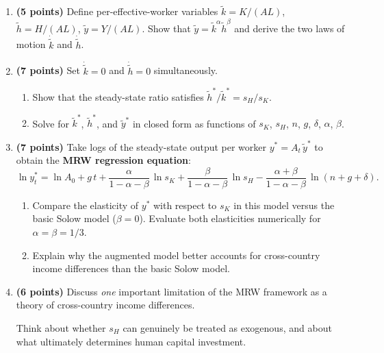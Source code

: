 \documentclass[a4paper,11pt]{article}
\newcommand{\ktilde}{\tilde{k}}
\newcommand{\ytilde}{\tilde{y}}
\newcommand{\htilde}{\tilde{h}}
\begin{document}
\begin{enumerate}[label=\textbf{\arabic*.}, leftmargin=*, itemsep=6pt]

    \item \textbf{(5 points)}
    Define per-effective-worker variables $\ktilde = K/(AL)$,
    $\htilde = H/(AL)$, $\ytilde = Y/(AL)$.  Show that $\ytilde = \ktilde^{\alpha}\htilde^{\beta}$
    and derive the two laws of motion $\dot{\ktilde}$ and $\dot{\htilde}$.

    \item \textbf{(7 points)}
    Set $\dot{\ktilde} = 0$ and $\dot{\htilde} = 0$ simultaneously.
    \begin{enumerate}[label=(\alph*), itemsep=4pt]
        \item Show that the steady-state ratio satisfies $\htilde^*/\ktilde^* = s_H/s_K$.
        \item Solve for $\ktilde^*$, $\htilde^*$, and $\ytilde^*$ in closed form as
        functions of $s_K$, $s_H$, $n$, $g$, $\delta$, $\alpha$, $\beta$.
    \end{enumerate}

    \item \textbf{(7 points)}
    Take logs of the steady-state output per worker $y^* = A_t\,\ytilde^*$ to obtain the
    \textbf{MRW regression equation}:
    \[
        \ln y_t^* = \ln A_0 + g\,t
        + \frac{\alpha}{1-\alpha-\beta}\,\ln s_K
        + \frac{\beta}{1-\alpha-\beta}\,\ln s_H
        - \frac{\alpha+\beta}{1-\alpha-\beta}\,\ln(n+g+\delta).
    \]
    \begin{enumerate}[label=(\alph*), itemsep=4pt]
        \item Compare the elasticity of $y^*$ with respect to $s_K$ in this model versus
        the basic Solow model ($\beta=0$).  Evaluate both elasticities numerically for
        $\alpha = \beta = 1/3$.
        \item Explain why the augmented model better accounts for cross-country income
        differences than the basic Solow model.
    \end{enumerate}

    \item \textbf{(6 points)}
    Discuss \emph{one} important limitation of the MRW framework as a theory of
    cross-country income differences.

    \begin{hintbox}
        Think about whether $s_H$ can genuinely be treated as exogenous, and about
        what ultimately determines human capital investment.
    \end{hintbox}

\end{enumerate}
\end{document}
